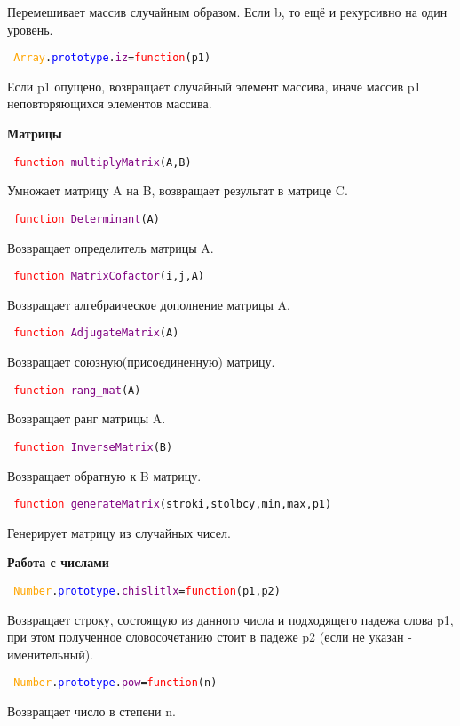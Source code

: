 Перемешивает массив случайным образом. Если b, то ещё и рекурсивно на один уровень.

\hypertarget{iz}{\texttt{
		\textcolor{Orange}{Array}.\textcolor{Blue}{prototype}.\textcolor{Purple}{iz}=\textcolor{Red}{function}(p1)
	}}

Если p1 опущено, возвращает случайный элемент массива, иначе массив p1 неповторяющихся элементов массива.

\textbf{Матрицы}

\texttt{
	\textcolor{Red}{function} \textcolor{Purple}{multiplyMatrix}(A,B)
}

Умножает матрицу A на B, возвращает результат в матрице C.

\texttt{
	\textcolor{Red}{function} \textcolor{Purple}{Determinant}(A)
}

Возвращает определитель матрицы A.

\texttt{
	\textcolor{Red}{function} \textcolor{Purple}{MatrixCofactor}(i,j,A)
}

Возвращает алгебраическое дополнение матрицы A.

\texttt{
	\textcolor{Red}{function} \textcolor{Purple}{AdjugateMatrix}(A)
}

Возвращает союзную(присоединенную) матрицу.

\texttt{
	\textcolor{Red}{function} \textcolor{Purple}{rang\_mat}(А)
}

Возвращает ранг матрицы A.

\texttt{
	\textcolor{Red}{function} \textcolor{Purple}{InverseMatrix}(B)
}

Возвращает обратную  к B матрицу.

\texttt{
	\textcolor{Red}{function} \textcolor{Purple}{generateMatrix}(stroki,stolbcy,min,max,p1)
}

Генерирует матрицу из случайных чисел.

\textbf{Работа с числами}

\hypertarget{chislitlx}{\texttt{
	\textcolor{Orange}{Number}.\textcolor{Blue}{prototype}.\textcolor{Purple}{chislitlx}=\textcolor{Red}{function}(p1,p2)
}}

Возвращает строку, состоящую из данного числа и подходящего падежа слова p1, при этом
полученное словосочетанию стоит в падеже p2 (если не указан - именительный).

\texttt{
	\textcolor{Orange}{Number}.\textcolor{Blue}{prototype}.\textcolor{Purple}{pow}=\textcolor{Red}{function}(n)
}

Возвращает число в степени n.

